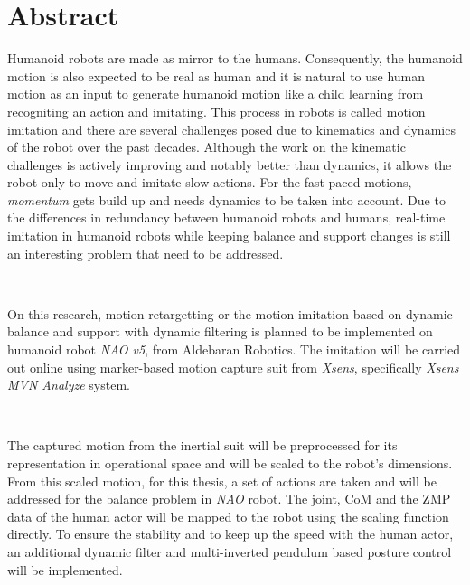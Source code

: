 \documentclass{thesisreport}
\begin{document}
   
 
  \section*{Abstract}
   
  Humanoid robots are made as mirror to the humans. Consequently, the humanoid motion is also expected to be real as 
  human and it is natural to use human motion as an input to generate humanoid motion like a child learning from recogniting
  an action and imitating. This process in robots is called motion imitation and there are several challenges posed 
  due to kinematics and dynamics of the robot over the past decades. Although the work on the kinematic challenges is 
  actively improving and notably better than dynamics, it allows the robot only to move and imitate slow actions. 
  For the fast paced motions, \textit{momentum} gets build up and needs dynamics to be taken into account. Due to the 
  differences in redundancy between humanoid robots and humans, real-time imitation in humanoid robots while keeping 
  balance and support changes is still an interesting problem that need to be addressed.

  ~
  
  On this research, motion retargetting or the motion imitation based on dynamic balance and support with dynamic filtering 
  is planned to be implemented on humanoid robot \textit{NAO v5}, from Aldebaran Robotics. The imitation will be carried out 
  online using marker-based motion capture suit from \textit{Xsens}, specifically \textit{Xsens MVN Analyze} system.
  
  ~
  
  The captured motion from the inertial suit will be preprocessed for its representation in operational space and will be 
  scaled to the robot's dimensions. From this scaled motion, for this thesis, a set of actions are taken and will be addressed
  for the balance problem in \textit{NAO} robot. The joint, CoM and the ZMP data of the human actor will be mapped to the robot
  using the scaling function directly. To ensure the stability and to keep up the speed with the human actor, an additional 
  dynamic filter and multi-inverted pendulum based posture control will be implemented. 
 
 \newpage
 
 
\end{document}
